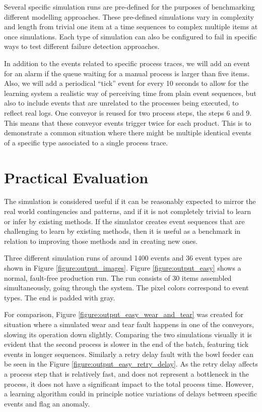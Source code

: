 \documentclass[procedia]{easychair}
\begin{document}
Several specific simulation runs are pre-defined for the purposes of benchmarking
different modelling approaches. These pre-defined simulations vary in complexity and length from trivial one item at a time sequences to complex multiple items at once simulations.
Each type of simulation can also be configured to fail in specific ways to test different failure detection approaches.

In addition to the events related to specific process traces, we will add an event for an alarm if the queue waiting for a manual process is larger than five items. Also, we will
add a periodical ``tick'' event for every 10 seconds to allow for the learning system a realistic way of perceiving time from plain event sequences, but also to include events that are unrelated to
the processes being executed, to reflect real logs. One conveyor is reused for two process steps, the steps 6 and 9. This means that these conveyor events
trigger twice for each product. This is to demonstrate a common situation where there might be multiple identical events of a specific type
associated to a single process trace.

\section{Practical Evaluation}

The simulation is considered useful if it can be reasonably expected to mirror the real world contingencies and patterns, and if it is not completely trivial to
learn or infer by existing methods. If the simulator creates event sequences that are challenging to learn by existing methods, then it is useful as a benchmark
in relation to improving those methods and in creating new ones.

Three different simulation runs of around 1400 events and 36 event types are shown in Figure \ref{figure:output_images}. Figure \ref{figure:output_easy} shows a normal, fault-free production run.
The run consists of 30 items assembled simultaneously, going through the system.
The pixel colors correspond to event types. The end is padded with gray.

For comparison, Figure \ref{figure:output_easy_wear_and_tear} was
created for situation where a simulated wear and tear fault happens in one of the conveyors, slowing its operation down slightly. Comparing the two simulations visually it is evident that the second process
is slower in the end of the batch, featuring tick events in longer sequences.
Similarly a retry delay fault with the bowl feeder can be seen in the Figure \ref{figure:output_easy_retry_delay}. As the retry delay affects a process step that is relatively fast, and does not 
represent a bottleneck in the process, it does not have a significant impact to the total process time. However, a learning algorithm could in principle notice variations of delays between specific events
and flag an anomaly.
\end{document}
